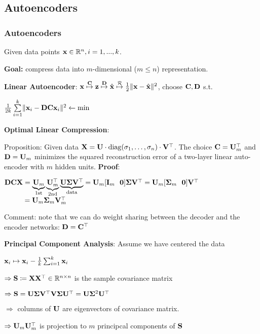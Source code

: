 
\subsection{Autoencoders}
\label{sub:autoencoders}

    \subsubsection{Autoencoders}
    \label{ssub:autoencoders}
    Given data points $\mathbf x\in\mathbb R^n, i=1,...,k$.
    
    \textbf{Goal:} compress data into $m$-dimensional ($m\leq n$) representation.
    
    \textbf{Linear Autoencoder}: $\mathbf x\overset{\mathbf C}{\mapsto}\mathbf z\overset{\mathbf D}{\mapsto}\hat{\mathbf x}\overset{\mathcal{R}}{\mapsto}\frac{1}{2}\lVert\mathbf x-\hat{\mathbf x}\rVert^2$, choose $\mathbf C,\mathbf D$ s.t. 
    
    \tab$\frac{1}{2k}\sum\limits^k_{i=1}\lVert\mathbf x_i-\mathbf D\mathbf C\mathbf x_i\rVert^2\xleftarrow{}\min$
    
    \textbf{Optimal Linear Compression}: 
    
    \tab Proposition: Given data $\mathbf X=\mathbf U\cdot{\mathop{\mathrm{diag}}}(\sigma_1,\ldots,\sigma_n)\cdot \mathbf V^{\mathop{\mathrm{\top}}}$. The choice $\mathbf C=\mathbf U_m^{\mathop{\mathrm{\top}}}$ and $\mathbf D=\mathbf U_m$ minimizes the squared reconstruction error of a two-layer linear auto-encoder with $m$ hidden units.
    \textbf{Proof}: 
    
    \tab $\mathbf D\mathbf C\mathbf X=\underbrace{\mathbf U_m}_\text{1st} \underbrace{\mathbf U_m^{\mathop{\mathrm{\top}}}}_\text{2nd}\underbrace{\mathbf U\mathbf \Sigma\mathbf V^{\mathop{\mathrm{\top}}}}_\text{data}=\mathbf U_m\lbrack\mathbf I_m\>\>\> \mathbf{0} \rbrack \mathbf \Sigma \mathbf V^{\mathop{\mathrm{\top}}}=\mathbf U_m\lbrack \mathbf \Sigma_m\>\>\> \mathbf{0}\rbrack\mathbf V^{\mathop{\mathrm{\top}}}$\\
    \tab $\phantom{\vD\vC\vX}=\vU_m\vSi_m\vV_m\T$
    
    Comment: note that we can do weight sharing between the decoder and the encoder networks: $\mathbf D=\mathbf C^\top$
    
    \textbf{Principal Component Analysis}: Assume we have centered the data
    
    \tab $\mathbf x_i\mapsto\mathbf x_i-\frac{1}{k}\sum^k_{i=1}\mathbf x_i$
    
    $\Rightarrow \mathbf S\coloneqq\mathbf X\mathbf X^{\mathop{\mathrm{\top}}}\in\mathbb R^{n\times n}$ is the sample covariance matrix
    
    $\Rightarrow\mathbf S=\mathbf U\mathbf \Sigma\mathbf V^{\mathop{\mathrm{\top}}}\mathbf V\mathbf \Sigma\mathbf U^{\mathop{\mathrm{\top}}}=\mathbf U\mathbf \Sigma^2\mathbf U^{\mathop{\mathrm{\top}}}$
    
    $\Rightarrow$ columns of $\mathbf U$ are eigenvectors of covariance matrix.
    
    $\Rightarrow\mathbf U_m\mathbf U_m^{\mathop{\mathrm{\top}}}$ is projection to $m$ principcal components of $\mathbf S$
    
